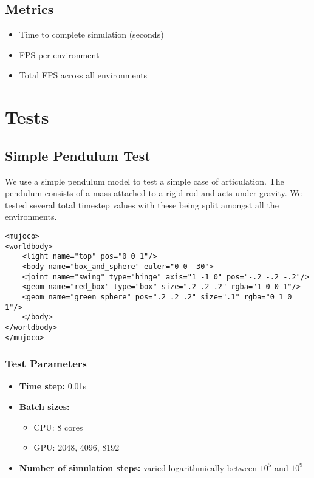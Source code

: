 \documentclass[11pt,a4paper]{article}
\begin{document}
\subsection{Metrics}
\begin{itemize}
    \item Time to complete simulation (seconds)
    \item FPS per environment
    \item Total FPS across all environments
\end{itemize}

\section{Tests}
\subsection{Simple Pendulum Test}
We use a simple pendulum model to test a simple case of articulation. The pendulum consists of a mass attached to a rigid rod and acts under gravity. We tested several total timestep values with these being split amongst all the environments.

\begin{lstlisting}[style=xmlstyle, caption={Pendulum XML model}, label=lst:pendulum_xml]
<mujoco>
<worldbody>
    <light name="top" pos="0 0 1"/>
    <body name="box_and_sphere" euler="0 0 -30">
    <joint name="swing" type="hinge" axis="1 -1 0" pos="-.2 -.2 -.2"/>
    <geom name="red_box" type="box" size=".2 .2 .2" rgba="1 0 0 1"/>
    <geom name="green_sphere" pos=".2 .2 .2" size=".1" rgba="0 1 0 1"/>
    </body>
</worldbody>
</mujoco>
\end{lstlisting}

\subsubsection{Test Parameters}
\begin{itemize}
    \item \textbf{Time step:} 0.01s
    \item \textbf{Batch sizes:} 
    \begin{itemize}
        \item CPU: 8 cores 
        \item GPU: 2048, 4096, 8192
    \end{itemize}
    \item \textbf{Number of simulation steps:} varied logarithmically between $10^5$ and $10^9$
\end{itemize}
\end{document}
